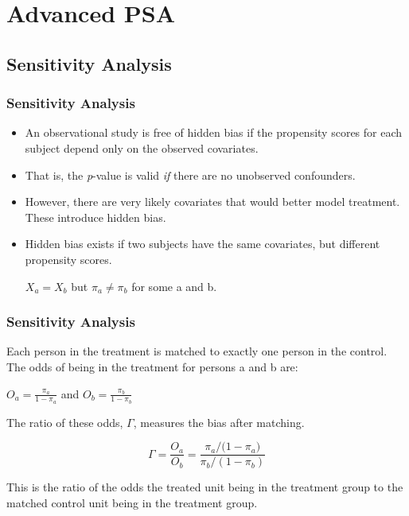 \documentclass[10pt,slidestop,mathserif,c]{beamer}
\begin{document}
\section{Advanced PSA}


\subsection{Sensitivity Analysis}

\begin{frame}
    \frametitle{Sensitivity Analysis}
    \begin{itemize}
        \item An observational study is free of hidden bias if the propensity scores for each subject depend only on the observed covariates.
        \item That is, the \textit{p}-value is valid \textit{if} there are no unobserved confounders.
        \item However, there are very likely covariates that would better model treatment. These introduce hidden bias.
        \item Hidden bias exists if two subjects have the same covariates, but different propensity scores.
        \begin{center}
        $X_a = X_b$ but ${ \pi  }_{ a }\neq { \pi  }_{ b }$ for some a and b.
        \end{center}
    \end{itemize}

\end{frame}

\begin{frame}
    \frametitle{Sensitivity Analysis}
    Each person in the treatment is matched to exactly one person in the control. The odds of being in the treatment for persons a and b are:
    
    \begin{center}
    $O_a = \frac{  \pi_a }{ 1 - \pi_a }$ and $O_b = \frac{  \pi_b }{ 1 - \pi_b }$
    \end{center}
    
    The ratio of these odds, $\Gamma$, measures the bias after matching.
    
     $$\Gamma =\frac { { O }_{ a } }{ { O }_{ b } } =\frac { { { \pi  }_{ a } / ( }{ 1-{ \pi  }_{ a }) } }{ { { \pi  }_{ b } / (1-{ \pi  }_{ b }) } } $$
   
   This is the ratio of the odds the treated unit being in the treatment group to the matched control unit being in the treatment group.
\end{frame}
\end{document}
